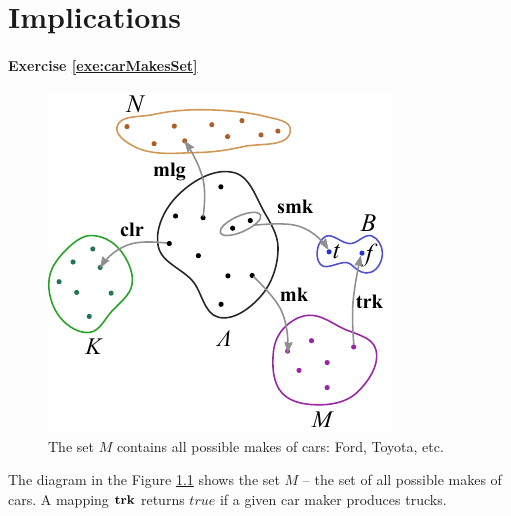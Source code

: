 \graphicspath{{../07Implications/pics/}}

\chapter{Implications}\label{ch:Implications}

\subsubsection*{Exercise \ref{exe:carMakesSet}}

\begin{figure}[htbp]
  \centering
  \includegraphics[scale=1.0]{diagramCars}
  \caption{The set $M$ contains all possible makes of cars: Ford,
    Toyota, etc.}
  \label{fig:diagramCars}
\end{figure}

The diagram in the Figure \ref{fig:diagramCars} shows the set $M$ -- the set
of all possible makes of cars. A mapping $\textrm{\bf {trk}}$ returns $true$ if a
given car maker produces trucks.

